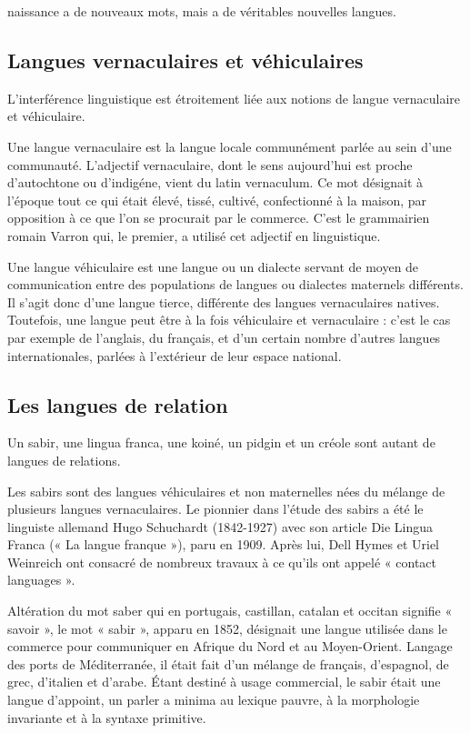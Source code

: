 
naissance a de nouveaux mots, mais a de véritables nouvelles langues.


\subsection{Langues vernaculaires et véhiculaires}

L’interférence linguistique est étroitement liée aux notions de langue vernaculaire et véhiculaire.


Une langue vernaculaire est la langue locale communément parlée au sein d’une communauté. L’adjectif vernaculaire, dont le sens aujourd’hui est proche d’autochtone ou d’indigéne, vient du latin vernaculum. Ce mot désignait à l’époque tout ce qui était élevé, tissé, cultivé, confectionné à la maison, par opposition à ce que l’on se procurait par le commerce. C’est le grammairien romain Varron qui, le premier, a utilisé cet adjectif en linguistique.

Une langue véhiculaire est une langue ou un dialecte servant de moyen de communication entre des populations de langues ou dialectes maternels différents. Il s’agit donc d’une langue tierce, différente des langues vernaculaires natives. Toutefois, une langue peut être à la fois véhiculaire et vernaculaire : c’est le cas par exemple de l’anglais, du français, et d’un certain nombre d’autres langues internationales, parlées à l’extérieur de leur espace national.

\subsection{Les langues de relation} Un sabir, une lingua franca, une koiné, un pidgin et un créole sont autant de langues de relations.


Les sabirs sont des langues véhiculaires et non maternelles nées du mélange de plusieurs langues vernaculaires. Le pionnier dans l’étude des sabirs a été le linguiste allemand Hugo Schuchardt (1842-1927) avec son article Die Lingua Franca (« La langue franque »), paru en 1909. Après lui, Dell Hymes et Uriel Weinreich ont consacré de nombreux travaux à ce qu’ils ont appelé « contact languages ».

Altération du mot saber qui en portugais, castillan, catalan et occitan signifie « savoir », le mot « sabir », apparu en 1852, désignait une langue utilisée dans le commerce pour communiquer en Afrique du Nord et au Moyen-Orient. Langage des ports de Méditerranée, il était fait d’un mélange de français, d’espagnol, de grec, d’italien et d’arabe. Étant destiné à usage commercial, le sabir était une langue d’appoint, un parler a minima au lexique pauvre, à la morphologie invariante et à la syntaxe primitive.


